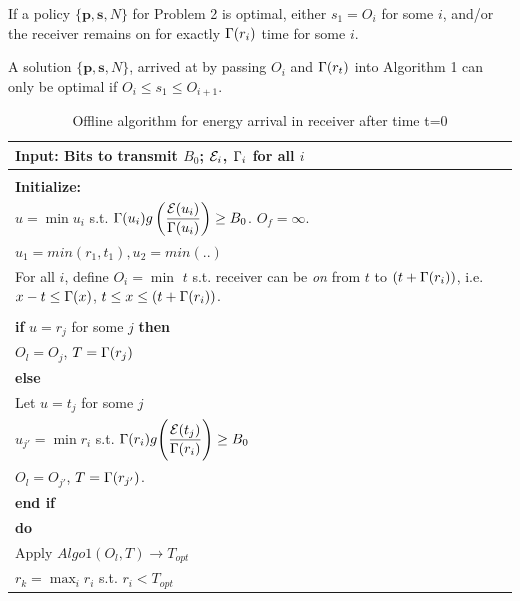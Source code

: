 \begin{lemma}
If a policy $\{\bm{p},\bm{s},N\}$ for Problem 2 is optimal, either $s_1 = O_i$ for some $i$, and/or the receiver remains on for exactly $\Gamma(r_i)$ time for some $i$.
\label{lemma_startpoints}
\end{lemma}

\begin{lemma}
A solution $\{\bm{p},\bm{s},N\}$, arrived at by passing $O_i$ and $\Gamma(r_t)$ into Algorithm 1 can only be optimal if $O_i\leq s_1\leq O_{i+1}$.
\label{lemma_startpoints}
\end{lemma}

\begin{table}
\begin{minipage}[b]{8cm}
\caption {Offline algorithm for energy arrival in receiver after time t=0}
\begin{tabular}{p{7cm}}
\hline \textbf{Input}: Bits to transmit $B_0$; $\mathcal{E}_i$, $\Gamma_i$ for all $i$
\\
\hline
\\
\textbf{Initialize:}
\\ 
$u=\min u_i$ s.t. $\Gamma(u_i)g\left( \dfrac{\mathcal{E}(u_i)}{\Gamma(u_i)} \right) \ge B_0$. $O_f=\infty$.\\ $u_1=min(r_1,t_1),u_2=min(..)$
\\
For all $i$, define $O_i=\min$ $t$ s.t. receiver can be \textit{on} from $t$ to $(t+\Gamma(r_i))$, i.e. $x-t \le \Gamma(x)$,  $t \le x\le (t+\Gamma(r_i))$.
\\
\\
\textbf{if} $u=r_j$ for some $j$  \textbf{then}
\\
\hspace{4mm}$O_l=O_{j}$, $T=\Gamma(r_j)$
\\
\textbf{else}
\\
\hspace{4mm}Let $u=t_j$ for some $j$
\\
\hspace{4mm}$u_{j'}=\min r_i$ s.t. $\Gamma(r_i)g\Bigg{(} \dfrac{\mathcal{E}(t_j)}{\Gamma(r_i)}\Bigg{)}\ge B_0$
\\
\hspace{4mm}$O_l=O_{j'}$, $T=\Gamma(r_{j'})$.
\\
\textbf{end if}
\\
\textbf{do}
\\
\hspace{4mm}Apply $Algo1(O_l,T)\rightarrow T_{opt}$
\\
\hspace{4mm}$r_k=\max_i r_i $ s.t. $r_i<T_{opt}$ 

\end{tabular}
\end{minipage}
\end{table}
